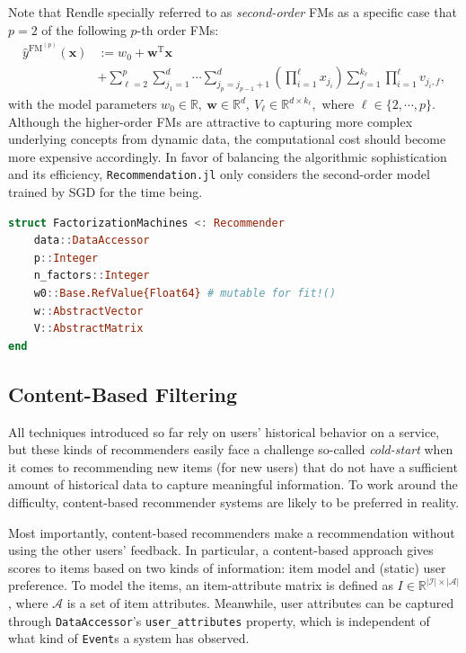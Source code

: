 Note that Rendle \cite{Rendle2012-1} specially referred to  as \textit{second-order} FMs as a specific case that $p=2$ of the following $p$-th order FMs:
\begin{align*}
\hat{y}^{\mathrm{FM}^{(p)}}(\mathbf{x}) &:= w_0 + \mathbf{w}^{\mathrm{T}} \mathbf{x} \\ &+ \sum^p_{\ell=2} \sum^d_{j_1 = 1} \cdots \sum^d_{j_p = j_{p-1} + 1} \left( \prod^{\ell}_{i=1} x_{j_i} \right) \sum^{k_{\ell}}_{f=1} \prod^{\ell}_{i=1} v_{j_i,f},
\end{align*}
with the model parameters $w_0 \in \mathbb{R}, \ \mathbf{w} \in \mathbb{R}^d, \ V_{\ell} \in \mathbb{R}^{d \times k_{\ell}},$ where $\ell \in \{2, \cdots, p\}$. Although the higher-order FMs are attractive to capturing more complex underlying concepts from dynamic data, the computational cost should become more expensive accordingly. In favor of balancing the algorithmic sophistication and its efficiency, \texttt{Recommendation.jl} only considers the second-order model trained by SGD for the time being.

\begin{lstlisting}[language = Julia]
struct FactorizationMachines <: Recommender
    data::DataAccessor
    p::Integer
    n_factors::Integer
    w0::Base.RefValue{Float64} # mutable for fit!()
    w::AbstractVector
    V::AbstractMatrix
end
\end{lstlisting}

\subsection{Content-Based Filtering}

All techniques introduced so far rely on users' historical behavior on a service, but these kinds of recommenders easily face a challenge so-called \textit{cold-start} when it comes to recommending new items (for new users) that do not have a sufficient amount of historical data to capture meaningful information. To work around the difficulty, content-based recommender systems \cite{Lops2011} are likely to be preferred in reality.

Most importantly, content-based recommenders make a recommendation without using the other users' feedback. In particular, a content-based approach gives scores to items based on two kinds of information: item model and (static) user preference. To model the items, an item-attribute matrix is defined as $I \in \mathbb{R}^{|\mathcal{I}| \times |\mathcal{A}|}$, where $\mathcal{A}$ is a set of item attributes. Meanwhile, user attributes can be captured through \texttt{DataAccessor}'s \texttt{user\_attributes} property, which is independent of what kind of \texttt{Event}s a system has observed.

